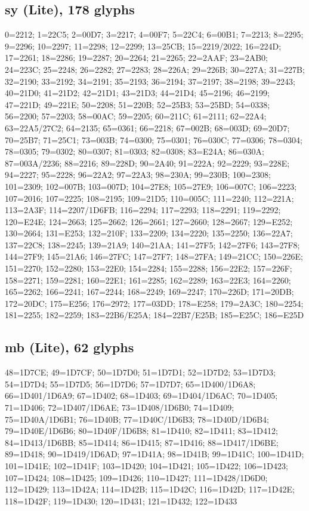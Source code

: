 \subsection*{sy (Lite), 178 glyphs}
\raggedright\small 0=2212; 1=22C5; 2=00D7; 3=2217; 4=00F7; 5=22C4; 6=00B1;
7=2213; 8=2295; 9=2296; 10=2297; 11=2298; 12=2299; 13=25CB; 15=2219/2022;
16=224D; 17=2261; 18=2286; 19=2287; 20=2264; 21=2265; 22=2AAF; 23=2AB0;
24=223C; 25=2248; 26=2282; 27=2283; 28=226A; 29=226B; 30=227A; 31=227B;
32=2190; 33=2192; 34=2191; 35=2193; 36=2194; 37=2197; 38=2198; 39=2243;
40=21D0; 41=21D2; 42=21D1; 43=21D3; 44=21D4; 45=2196; 46=2199; 47=221D;
49=221E; 50=2208; 51=220B; 52=25B3; 53=25BD; 54=0338; 56=2200; 57=2203;
58=00AC; 59=2205; 60=211C; 61=2111; 62=22A4; 63=22A5/27C2; 64=2135; 65=0361;
66=2218; 67=002B; 68=003D; 69=20D7; 70=25B7; 71=25C1; 73=003B; 74=0300;
75=0301; 76=030C; 77=0306; 78=0304; 78=0305; 79=0302; 80=0307; 81=0303;
82=0308; 83=E24A; 86=030A; 87=003A/2236; 88=2216; 89=228D; 90=2A40; 91=222A;
92=2229; 93=228E; 94=2227; 95=2228; 96=22A2; 97=22A3; 98=230A; 99=230B;
100=2308; 101=2309; 102=007B; 103=007D; 104=27E8; 105=27E9; 106=007C; 106=2223;
107=2016; 107=2225; 108=2195; 109=21D5; 110=005C; 111=2240; 112=221A; 113=2A3F;
114=2207/1D6FB; 116=2294; 117=2293; 118=2291; 119=2292; 120=E24E; 124=2663;
125=2662; 126=2661; 127=2660; 128=2667; 129=E252; 130=2664; 131=E253; 132=210F;
133=2209; 134=2220; 135=2250; 136=22A7; 137=22C8; 138=2245; 139=21A9; 140=21AA;
141=27F5; 142=27F6; 143=27F8; 144=27F9; 145=21A6; 146=27FC; 147=27F7; 148=27FA;
149=21CC; 150=226E; 151=2270; 152=2280; 153=22E0; 154=2284; 155=2288; 156=22E2;
157=226F; 158=2271; 159=2281; 160=22E1; 161=2285; 162=2289; 163=22E3; 164=2260;
165=2262; 166=2241; 167=2244; 168=2249; 169=2247; 170=226D; 171=20DB; 172=20DC;
175=E256; 176=2972; 177=03DD; 178=E258; 179=2A3C; 180=2254; 181=2255; 182=2259;
183=22B6/E25A; 184=22B7/E25B; 185=E25C; 186=E25D\par

\subsection*{mb (Lite), 62 glyphs}
\raggedright\small 48=1D7CE; 49=1D7CF; 50=1D7D0; 51=1D7D1; 52=1D7D2; 53=1D7D3;
54=1D7D4; 55=1D7D5; 56=1D7D6; 57=1D7D7; 65=1D400/1D6A8; 66=1D401/1D6A9;
67=1D402; 68=1D403; 69=1D404/1D6AC; 70=1D405; 71=1D406; 72=1D407/1D6AE;
73=1D408/1D6B0; 74=1D409; 75=1D40A/1D6B1; 76=1D40B; 77=1D40C/1D6B3;
78=1D40D/1D6B4; 79=1D40E/1D6B6; 80=1D40F/1D6B8; 81=1D410; 82=1D411; 83=1D412;
84=1D413/1D6BB; 85=1D414; 86=1D415; 87=1D416; 88=1D417/1D6BE; 89=1D418;
90=1D419/1D6AD; 97=1D41A; 98=1D41B; 99=1D41C; 100=1D41D; 101=1D41E; 102=1D41F;
103=1D420; 104=1D421; 105=1D422; 106=1D423; 107=1D424; 108=1D425; 109=1D426;
110=1D427; 111=1D428/1D6D0; 112=1D429; 113=1D42A; 114=1D42B; 115=1D42C;
116=1D42D; 117=1D42E; 118=1D42F; 119=1D430; 120=1D431; 121=1D432; 122=1D433\par

